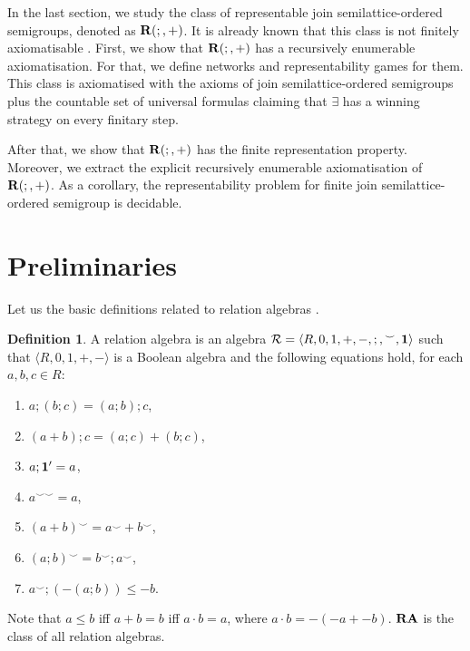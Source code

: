 \documentclass[a4paper]{article}
\theoremstyle{definition}
\newtheorem{definition}{Definition}
\theoremstyle{theorem}
\theoremstyle{proposition}
\theoremstyle{lemma}
\theoremstyle{ex}
\theoremstyle{corollary}
\theoremstyle{claim}
\begin{document}
In the last section, we study the class of representable join semilattice-ordered semigroups, denoted as ${\bf R}(;,+)$. It is
already known that this class is not finitely axiomatisable \cite{andreka2011axiomatizability}.
First, we show that ${\bf R}(;,+)$ has a recursively enumerable axiomatisation. For that,
we define networks and representability games for them. This class is axiomatised with the axioms of join semilattice-ordered semigroups plus the countable set of universal formulas claiming that
$\exists$ has a winning strategy on every finitary step.

After that, we show that ${\bf R}(;,+)$ has the finite representation property. Moreover, we extract the explicit recursively enumerable axiomatisation of ${\bf R}(;,+)$. As a corollary, the representability problem for finite join semilattice-ordered semigroup is decidable.

\section{Preliminaries}

Let us the basic definitions related to relation algebras \cite{hirsch2002relation}.
\begin{definition} A relation algebra is an algebra $\mathcal{R} = \langle R, 0, 1, +, -, ;, {}^{\smile}, {\bf 1 }\rangle$ such that $\langle R, 0, 1, +, - \rangle$ is a Boolean algebra and the following equations hold, for each $a, b, c \in R$:
    \begin{enumerate}
      \item $a ; (b ; c) = (a ; b) ; c$,
      \item $(a + b) ; c = (a ; c) + (b ; c)$,
      \item $a ; {\bf 1}' = a$,
      \item $a^{\smile \smile} = a$,
      \item $(a + b)^{\smile} = a^{\smile} + b^{\smile}$,
      \item $(a ; b)^{\smile} = b^{\smile} ; a^{\smile}$,
      \item $a^{\smile} ; (- (a ; b)) \leq - b$.
    \end{enumerate}
Note that $a \leq b$ iff $a + b = b$ iff $a \cdot b = a$, where $a \cdot b = - (- a + - b)$. ${\bf RA}$ is the class of all relation algebras.
\end{definition}
\end{document}
